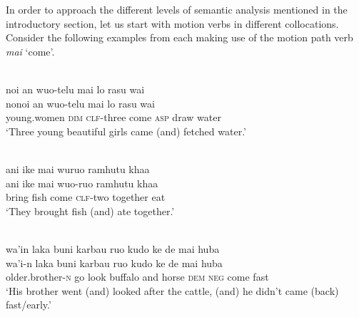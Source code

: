 In order to approach the different levels of semantic analysis mentioned in the introductory section, let us start with motion verbs in different collocations. Consider the following examples from  each making use of the motion path verb \textit{mai} `come'. 

\ea \label{WMH_Julio_goat099}
\\
\glll noi an wuo-telu mai lo rasu wai \\
nonoi an wuo-telu mai lo rasu wai \\
young.women \textsc{dim} \textsc{clf}-three come \textsc{asp} draw water\\
\glft `Three young beautiful girls came (and) fetched water.'\\ 
\z

\ea \label{WMH_Julio_goat049}
\\
\glll ani ike mai wuruo ramhutu khaa \\
ani ike mai wuo-ruo ramhutu khaa \\
bring fish come \textsc{clf}-two together eat\\
\glft `They brought fish (and) ate together.'\\
\z

\ea \label{WMH_Julio_goat057}
\\
\glll wa'in laka buni karbau ruo kudo ke de mai huba \\
wa'i-n laka buni karbau ruo kudo ke de mai huba \\
older.brother-\textsc{n} go look buffalo and horse \textsc{dem} \textsc{neg} come fast\\
\glft `His brother went (and) looked after the cattle, (and) he didn't came (back) fast/early.'\\
\z

